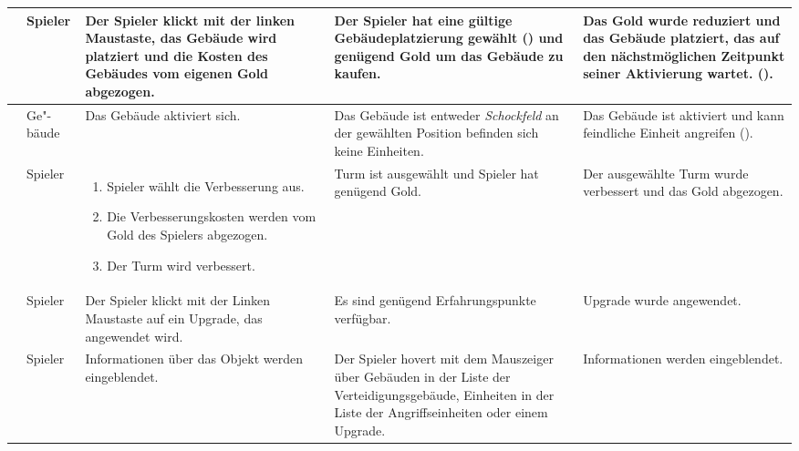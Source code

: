 \begin{longtabu}{X[0.6L]X[0.4L]X[L]X[L]X[L]}
    & Spieler
    & Der Spieler klickt mit der linken Maustaste, das Gebäude wird platziert
      und die Kosten des Gebäudes vom eigenen Gold abgezogen.
    & Der Spieler hat eine gültige Gebäudeplatzierung gewählt
      () und genügend Gold um das Gebäude zu kaufen.
    & Das Gold wurde reduziert und das Gebäude platziert, das auf den
      nächstmöglichen Zeitpunkt seiner Aktivierung wartet.
      ().
    \\\midrule

    & Ge"-bäude
    & Das Gebäude aktiviert sich.
    & Das Gebäude ist entweder \emph{Schockfeld} \textbf{} an der
      gewählten Position befinden sich keine Einheiten.
    & Das Gebäude ist aktiviert und kann feindliche Einheit angreifen
      ().
  \\\midrule

    & Spieler
    & \vspace*{-0.2cm}\begin{enumerate}[nosep, leftmargin=*]
        \item Spieler wählt die Verbesserung aus.
        \item Die Verbesserungskosten werden vom Gold des Spielers abgezogen.
        \item Der Turm wird verbessert.
      \end{enumerate}
    & Turm ist ausgewählt und Spieler hat genügend Gold.
    & Der ausgewählte Turm wurde verbessert und das Gold abgezogen.
  \\\midrule

    & Spieler
    & Der Spieler klickt mit der Linken Maustaste auf ein Upgrade, das
      angewendet wird.
    & Es sind genügend Erfahrungspunkte verfügbar.
    & Upgrade wurde angewendet.
  \\\midrule

    & Spieler
    & Informationen über das Objekt werden eingeblendet.
    & Der Spieler hovert mit dem Mauszeiger über Gebäuden in der Liste der
      Verteidigungsgebäude, Einheiten in der Liste der Angriffseinheiten oder
      einem Upgrade.
    & Informationen werden eingeblendet.

  \\\bottomrule
\end{longtabu}
\endgroup
